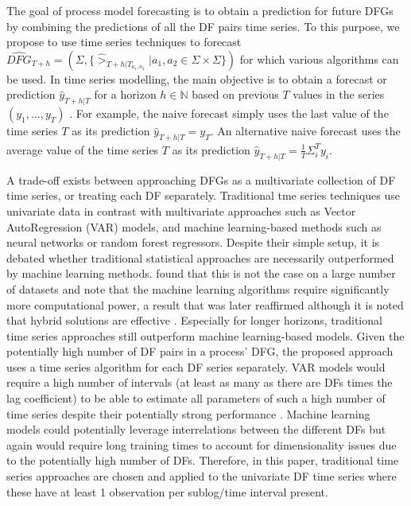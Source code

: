 The goal of process model forecasting is to obtain a prediction for future DFGs by combining the predictions of all the DF pairs time series.
To this purpose, we propose to use time series techniques to forecast $\widehat{DFG}_{T+h}=(\Sigma,\{\hat{>}_{T+h|T_{a_1,a_2}}|a_1,a_2\in \Sigma\times\Sigma\})$ for which various algorithms can be used.
In time series modelling, the main objective is to obtain a forecast or prediction $\hat{y}_{T+h|T}$ for a horizon $h\in \mathbb{N}$ based on previous $T$ values in the series $(y_1,...,y_T)$ \cite{hyndman2018forecasting}.
For example, the naive forecast simply uses the last value of the time series $T$ as its prediction $\hat{y}_{T+h|T}=y_T$.
An alternative naive forecast uses the average value of the time series $T$ as its prediction $\hat{y}_{T+h|T}=\frac{1}{T}\Sigma_i^{T} y_i$.

A trade-off exists between approaching DFGs as a multivariate collection of DF time series, or treating each DF separately.
Traditional tme series techniques use univariate data in contrast with multivariate approaches such as Vector AutoRegression (VAR) models, and machine learning-based methods such as neural networks or random forest regressors.
Despite their simple setup, it is debated whether traditional statistical approaches are necessarily outperformed by machine learning methods. 
\cite{makridakis2018statistical} found that this is not the case on a large number of datasets and note that the machine learning algorithms require significantly more computational power, a result that was later reaffirmed although it is noted that hybrid solutions are effective \cite{makridakis2020m4}.
Especially for longer horizons, traditional time series approaches still outperform machine learning-based models.
Given the potentially high number of DF pairs in a process' DFG, the proposed approach uses a time series algorithm for each DF series separately.
VAR models would require a high number of intervals (at least as many as there are DFs times the lag coefficient) to be able to estimate all parameters of such a high number of time series despite their potentially strong performance \cite{thomakos2004naive}.
Machine learning models could potentially leverage interrelations between the different DFs but again would require long training times to account for dimensionality issues due to the potentially high number of DFs. 
Therefore, in this paper, traditional time series approaches are chosen and applied to the univariate DF time series where these have at least 1 observation per sublog/time interval present.

